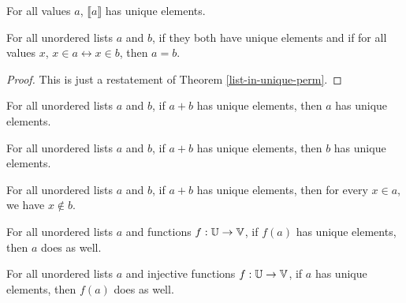 \documentclass[../math.tex]{subfiles}
\begin{document}
\begin{theorem}
    For all values $a$, $\llbracket a\rrbracket$ has unique elements.
\end{theorem}

\begin{theorem} \label{ulist-in-unique-eq}
    For all unordered lists $a$ and $b$, if they both have unique elements and
    if for all values $x$, $x \in a \leftrightarrow x \in b$, then $a = b$.
\end{theorem}
\begin{proof}
    This is just a restatement of Theorem \ref{list-in-unique-perm}.
\end{proof}

\begin{theorem} \label{ulist-unique-lconc}
    For all unordered lists $a$ and $b$, if $a + b$ has unique elements, then
    $a$ has unique elements.
\end{theorem}

\begin{theorem} \label{ulist-unique-rconc}
    For all unordered lists $a$ and $b$, if $a + b$ has unique elements, then
    $b$ has unique elements.
\end{theorem}

\begin{theorem} \label{ulist-unique-conc}
    For all unordered lists $a$ and $b$, if $a + b$ has unique elements, then
    for every $x \in a$, we have $x \notin b$.
\end{theorem}

\begin{theorem} \label{ulist-image-unique}
    For all unordered lists $a$ and functions $f : \mathbb{U} \to \mathbb{V}$, if $f(a)$ has
    unique elements, then $a$ does as well.
\end{theorem}

\begin{theorem} \label{ulist-image-unique-inj}
    For all unordered lists $a$ and injective functions $f : \mathbb{U} \to \mathbb{V}$, if $a$
    has unique elements, then $f(a)$ does as well.
\end{theorem}
\end{document}
